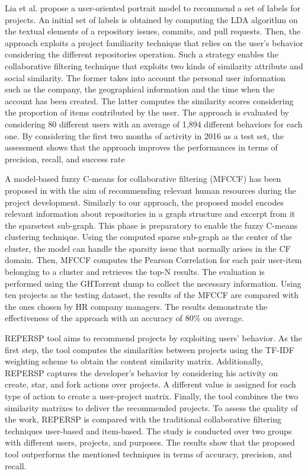 Lia et al. \cite{liao_user_2018} propose a user-oriented portrait model to recommend a set of labels for \GH projects. An initial set of labels is obtained by computing the LDA algorithm on the textual elements of a repository \ie issues, commits, and pull requests. Then, the approach exploits a project familiarity technique that relies on the user's behavior considering the different repositories operation. Such a strategy enables the collaborative filtering technique that exploits two kinds of similarity \ie attribute and social similarity. The former takes into account the personal user information such as the company, the geographical information and the time when the account has been created. The latter computes the similarity scores considering the proportion of items contributed by the user. The approach is evaluated by considering 80 different users with an average of 1,894 different behaviors for each one. By considering the first two months of activity in 2016 as a test set, the assessment shows that the approach improves the performances in terms of precision, recall, and success rate


A model-based fuzzy C-means for collaborative filtering (MFCCF) has been proposed in \cite{ajoudanian_recommending_2019} with the aim of recommending relevant human resources during the \GH project development. Similarly to our approach, the proposed model encodes relevant information about repositories in a graph structure and excerpt from it the sparsetest sub-graph. This phase is preparatory to enable the fuzzy C-means clustering technique. Using the computed sparse sub-graph as the center of the cluster, the model can handle the sparsity issue that normally arises in the CF domain. Then, MFCCF computes the Pearson Correlation for each pair user-item belonging to a cluster and retrieves the top-N results. The evaluation is performed using the GHTorrent dump to collect the necessary information. Using ten projects as the testing dataset, the results of the MFCCF are compared with the ones chosen by HR company managers. The results demonstrate the effectiveness of the approach with an accuracy of 80\% on average. 

REPERSP tool \cite{xu_repersp_2017} aims to recommend \GH projects by exploiting users' behavior. As the first step, the tool computes the similarities between projects using the TF-IDF weighting scheme to obtain the content similarity matrix. Additionally, REPERSP captures the developer's behavior by considering his activity on \GH \ie create, star, and fork actions over projects. A different value is assigned for each type of action to create a user-project matrix. Finally, the tool combines the two similarity matrixes to deliver the recommended projects. To assess the quality of the work, REPERSP is compared with the traditional collaborative filtering techniques \ie user-based and item-based. The study is conducted over two groups with different users, projects, and purposes. The results show that the proposed tool outperforms the mentioned techniques in terms of accuracy, precision, and recall. 

